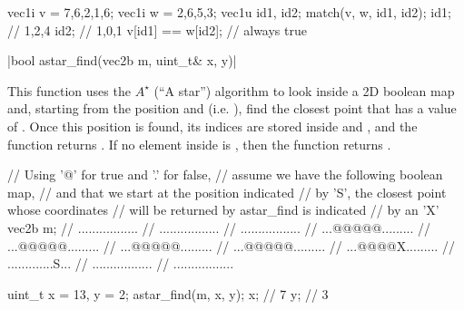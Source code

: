 \begin{example}
\begin{cppcode}
vec1i v = {7,6,2,1,6};
vec1i w = {2,6,5,3};
vec1u id1, id2;
match(v, w, id1, id2);
id1; // {1,2,4}
id2; // {1,0,1}
v[id1] == w[id2]; // always true
\end{cppcode}
\end{example}

\funcitem \cppinline|bool astar_find(vec2b m, uint_t& x, y)| 

This function uses the $A^\star$ (``A star'') algorithm to look inside a 2D boolean map  and, starting from the position  and  (i.e. ), find the closest point that has a value of \cpptrue. Once this position is found, its indices are stored inside  and , and the function returns \cpptrue. If no element inside  is \cpptrue, then the function returns \cppfalse.

\begin{example}
\begin{cppcode}
// Using '@' for true and '.' for false,
// assume we have the following boolean map,
// and that we start at the position indicated
// by 'S', the closest point whose coordinates
// will be returned by astar_find is indicated
// by an 'X'
vec2b m;
// .................
// .................
// .................
// ...@@@@@.........
// ...@@@@@.........
// ...@@@@@.........
// ...@@@@@.........
// ...@@@@X.........
// .............S...
// .................
// .................

uint_t x = 13, y = 2;
astar_find(m, x, y);
x; // 7
y; // 3
\end{cppcode}
\end{example}
